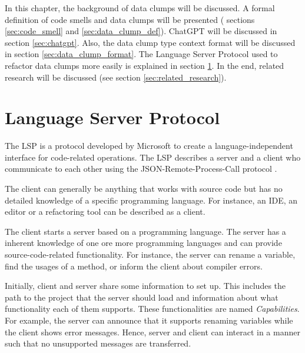 In this chapter, the background of data clumps will be discussed. A formal definition of code smells and data clumps will be presented ( sections \ref{sec:code_smell} and \ref{sec:data_clump_def}). ChatGPT will be discussed in section \ref{sec:chatgpt}. Also, the data clump type context format will be discussed in section \ref{sec:data_clump_format}. The Language Server Protocol used to refactor data clumps more easily is explained in section \ref{sec:lsp}. In the end, related research will be discussed (see section \ref{sec:related_research}). 









\section{Language Server Protocol} \label{sec:lsp}
The \ac{LSP}  \cite{lsp_website} is a protocol developed by Microsoft to create a language-independent interface for code-related operations. 
The \ac{LSP}  describes a server and a client who communicate to each other using the JSON-Remote-Process-Call protocol \cite{json_rpc}. 

The client can generally be anything that works with source code but has no detailed knowledge of a specific programming language. For instance, an \ac{IDE}, an editor or a refactoring tool can be described as a client.

The client starts a server based on a programming language. The server has a inherent knowledge of one ore more programming languages and can provide source-code-related functionality. For instance, the server can rename a variable, find the usages of a method, or inform the client about compiler errors. 

Initially, client and server share some information to set up. This includes the path to the project that the server should load and information about what functionality each of them supports. These functionalities are named \textit{Capabilities}. For example, the server can announce that it supports renaming variables while the client shows error messages. Hence, server and client can interact in a manner such that no unsupported messages are transferred.

